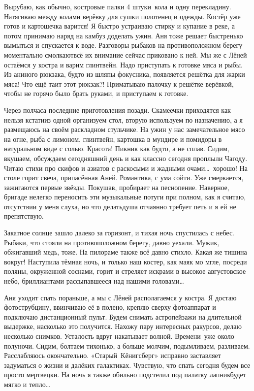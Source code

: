 Вырубаю, как обычно, костровые палки 4 штуки~кола и одну перекладину. Натягиваю между колами верёвку для сушки полотенец и одежды. Костёр уже готов и картошечка варится! Я быстро устраиваю стирку и купание в реке, а потом принимаю наряд на камбуз доделать ужин. Аня тоже решает быстренько вымыться и спускается к воде. Разговоры рыбаков на противоположном берегу моментально смолкают\mdash всё их внимание сейчас приковано к ней. Мы же с Лёней остаёмся у костра и варим глинтвейн. Надо приступать к готовке мяса и рыбы. Из аниного рюкзака, будто из шляпы фокусника, появляется решётка для жарки мяса! Что ещё таит этот рюкзак?! Приматываю палочку к решётке верёвкой, чтобы не горячо было брать руками, и приступаем к готовке. 

Через полчаса последние приготовления позади. Скамеечки приходятся как нельзя кстати\mdash из одной организуем стол, вторую используем по назначению, а я размещаюсь на своём раскладном стульчике. На ужин у нас замечательное мясо на огне, рыба с лимоном, глинтвейн, картошка в мундире и помидоры в натуральном виде с солью. Красота! Пикник как будто, а не сплав. Сидим, вкушаем, обсуждаем сегодняшний день и как классно сегодня проплыли Чагоду. Читаю стихи про скифов и азиатов с раскосыми и жадными очами\ldots~хорошо! На столе горит свеча, припасённая Аней. Романтика, с ума сойти. Уже смеркается, зажигаются первые звёзды. Покушав, пробирает на песнопение. Наверное, бригаде нелегко переносить эти музыкальные потуги при полном, как я считаю, отсутствии у меня слуха, но что делать\mdash душа отчаянно требует петь и я ей не препятствую. 

Закатное солнце зашло далеко за горизонт, и тихая ночь спустилась с небес. Рыбаки, что стояли на противоположном берегу, давно уехали. Мужик, обжигавший медь, тоже. На пилораме также всё давно стихло. Какая же тишина вокруг! Наступила тёмная ночь, и только наш костер, как маяк мо мгле, посреди поляны, окруженной соснами, горит и стреляет искрами в высокое августовское небо, бриллиантами рассыпавшееся над нашими головами\ldots~

Аня уходит спать пораньше, а мы с Лёней располагаемся у костра. Я достаю фотострубцину, ввинчиваю её в полено, креплю сверху фотоаппарат и подключаю дистанционный пульт. Будем снимать астропейзажи на длительной выдержке, насколько это получится. Нахожу пару интересных ракурсов, делаю несколько снимков. Усталость вдруг накатывает волной. Времени~уже около полуночи. Сидим, болтаем тихонько, а больше молчим, подымливаем, разливаем. Расслабляюсь окончательно. «Старый~Кёнигсберг» исправно заставляет задуматься о жизни и далёких галактиках. Чувствую, что спать сегодня будем все просто мертвецки. На ночь я также обильно подстелил под палатку лапник\mdash будет мягко и тепло\ldots~
  
